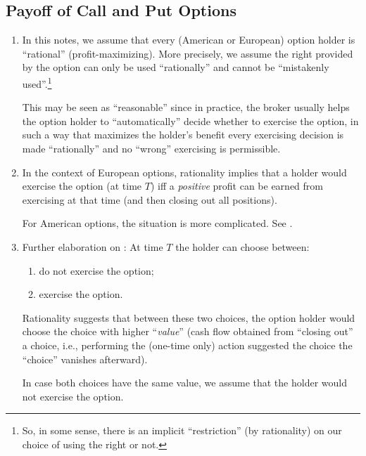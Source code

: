 \subsection{Payoff of Call and Put Options}
\begin{enumerate}
\item \label{it:option-holder-rational}
In this notes, we assume that every (American or European) option holder
is ``rational'' (profit-maximizing). More precisely, we assume the right
provided by the option can only be used ``rationally'' and cannot be
``mistakenly used''.\footnote{So, in some sense, there is an implicit
``restriction'' (by rationality) on our choice of using the right or not.}

This may be seen as ``reasonable'' since in practice, the broker usually helps
the option holder to ``automatically'' decide whether to exercise the option,
in such a way that maximizes the holder's benefit  every
exercising decision is made ``rationally'' and no ``wrong'' exercising is
permissible.

\item \label{it:euro-option-rational}
In the context of European options, rationality implies that a holder
would exercise the option (at time \(T\)) iff a \emph{positive} profit can be
earned from exercising at that time (and then closing out all positions).

\begin{note}
For American options, the situation is more complicated. See
.
\end{note}

\item Further elaboration on : At time \(T\)
the holder can choose between:
\begin{enumerate}
\item do not exercise the option;
\item exercise the option.
\end{enumerate}
Rationality suggests that between these two choices, the option holder would
choose the choice with higher ``\emph{value}'' (cash flow obtained from
``closing out'' a choice, i.e., performing the (one-time only) action suggested
the choice  the ``choice'' vanishes afterward).

\begin{note} In case both choices have the same value, we assume that the
holder would not exercise the option.
\end{note}


\end{enumerate}
